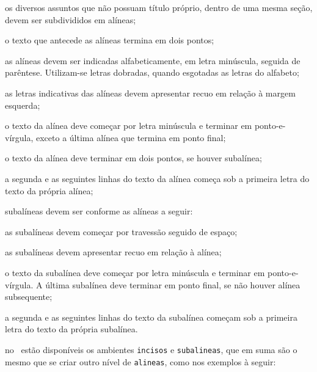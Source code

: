 \begin{alineas}

  \item os diversos assuntos que não possuam título próprio, dentro de uma mesma
  seção, devem ser subdivididos em alíneas; 
  
  \item o texto que antecede as alíneas termina em dois pontos;
  \item as alíneas devem ser indicadas alfabeticamente, em letra minúscula,
  seguida de parêntese. Utilizam-se letras dobradas, quando esgotadas as
  letras do alfabeto;

  \item as letras indicativas das alíneas devem apresentar recuo em relação à
  margem esquerda;

  \item o texto da alínea deve começar por letra minúscula e terminar em
  ponto-e-vírgula, exceto a última alínea que termina em ponto final;

  \item o texto da alínea deve terminar em dois pontos, se houver subalínea;

  \item a segunda e as seguintes linhas do texto da alínea começa sob a
  primeira letra do texto da própria alínea;
  
  \item subalíneas \cite[4.3]{NBR6024:2012} devem ser conforme as alíneas a
  seguir:

  \begin{alineas}
     \item as subalíneas devem começar por travessão seguido de espaço;

     \item as subalíneas devem apresentar recuo em relação à alínea;

     \item o texto da subalínea deve começar por letra minúscula e terminar em
     ponto-e-vírgula. A última subalínea deve terminar em ponto final, se não
     houver alínea subsequente;

     \item a segunda e as seguintes linhas do texto da subalínea começam sob a
     primeira letra do texto da própria subalínea.
  \end{alineas}
  
  \item no \abnTeX\ estão disponíveis os ambientes \texttt{incisos} e
  \texttt{subalineas}, que em suma são o mesmo que se criar outro nível de
  \texttt{alineas}, como nos exemplos à seguir:
  

\end{alineas}
